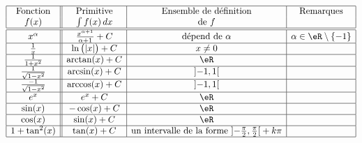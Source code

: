 \label{PageLCHooMbWjOj}
\begin{equation*}
	\begin{array}[]{|c||c|c|c|}
		\hline
		\text{Fonction}           & \text{Primitive}                      & \text{Ensemble de définition}                                                                   & \text{Remarques}               \\
		f(x)                      & \int f(x)\, dx                        & \text{de } f                                                                                    &                                \\
		\hline\hline
		x^{\alpha}                & \frac{ x^{\alpha+1} }{ \alpha+1 } + C & \text{dépend de }\alpha                                                                         & \alpha\in \eR\setminus\{ -1 \} \\
		\hline
		\frac{1}{ x }             & \ln\big( | x | \big) + C              & x\neq 0                                                                                         &                                \\
		\hline
		\frac{1}{ 1+x^2 }         & \arctan(x) + C                        & \eR                                                                                             &                                \\
		\hline
		\frac{1}{ \sqrt{1-x^2} }  & \arcsin(x) + C                        & \mathopen] -1 , 1 \mathclose[                                                                   &                                \\
			\hline
		\frac{-1}{ \sqrt{1-x^2} } & \arccos(x) + C                        & \mathopen] -1 , 1 \mathclose[                                                                   &                                \\
			\hline
		e^x                       & e^x + C                               & \eR                                                                                             &                                \\
			\hline
		\sin(x)                   & -\cos(x) + C                          & \eR                                                                                             &                                \\
			\hline
		\cos(x)                   & \sin(x) + C                           & \eR                                                                                             &                                \\
			\hline
		1+\tan^2(x)               & \tan(x) + C                           & \text{un intervalle de la forme }\mathopen] -\frac{ \pi }{2} , \frac{ \pi }{2} \mathclose[+k\pi &                                \\
		\hline
	\end{array}
\end{equation*}



